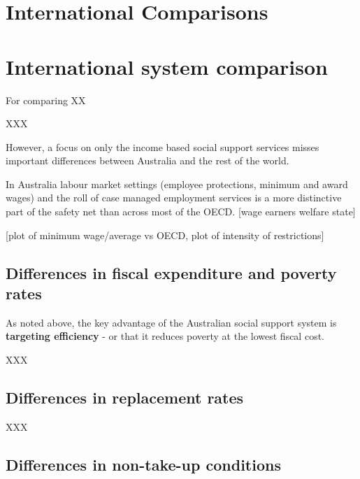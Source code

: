 \documentclass[
  letterpaper,
  DIV=11,
  numbers=noendperiod]{scrreprt}
\begin{document}
\hypertarget{international-comparisons}{%
\chapter{International Comparisons}\label{international-comparisons}}


\hypertarget{international-system-comparison}{%
\chapter{International system
comparison}\label{international-system-comparison}}

For comparing XX

XXX

However, a focus on only the income based social support services misses
important differences between Australia and the rest of the world.

In Australia labour market settings (employee protections, minimum and
award wages) and the roll of case managed employment services is a more
distinctive part of the safety net than across most of the OECD. {[}wage
earners welfare state{]}

{[}plot of minimum wage/average vs OECD, plot of intensity of
restrictions{]}

\hypertarget{differences-in-fiscal-expenditure-and-poverty-rates}{%
\section{Differences in fiscal expenditure and poverty
rates}\label{differences-in-fiscal-expenditure-and-poverty-rates}}

As noted above, the key advantage of the Australian social support
system is \textbf{targeting efficiency} - or that it reduces poverty at
the lowest fiscal cost.

XXX

\hypertarget{differences-in-replacement-rates}{%
\section{Differences in replacement
rates}\label{differences-in-replacement-rates}}

XXX

\hypertarget{differences-in-non-take-up-conditions}{%
\section{Differences in non-take-up
conditions}\label{differences-in-non-take-up-conditions}}
\end{document}

